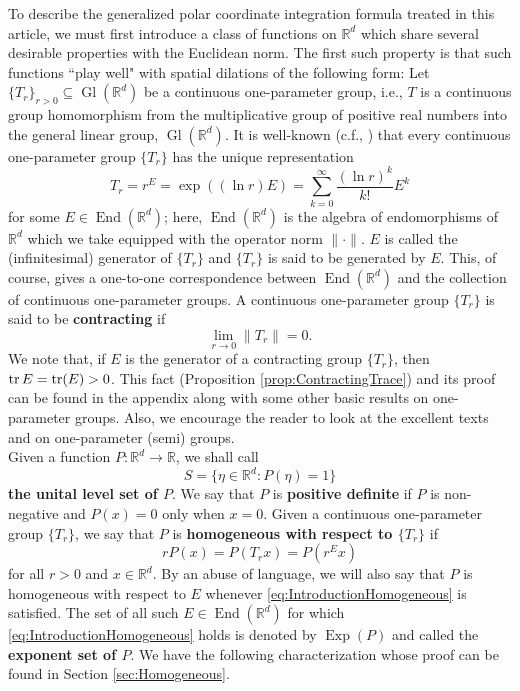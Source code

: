 \documentclass[smallextended]{svjour3}
\theoremstyle{remark}
\newcommand\End{\operatorname{End}} %
\newcommand\Gl{\operatorname{Gl}} %
\newcommand\Exp{\operatorname{Exp}}
\begin{document}
\noindent To describe the generalized polar coordinate integration formula treated in this article, we must first introduce a class of functions on $\mathbb{R}^d$ which share several desirable properties with the Euclidean norm. The first such property is that such functions ``play well" with spatial dilations of the following form: Let $\{T_r\}_{r>0}\subseteq \Gl(\mathbb{R}^d)$ be a continuous one-parameter group, i.e., $T$ is a continuous group homomorphism from the multiplicative group of positive real numbers into the general linear group, $\Gl(\mathbb{R}^d)$. It is well-known (c.f., \cite{randles_convolution_2017,engel_one-parameter_2000,engel_short_2006}) that every continuous one-parameter group $\{T_r\}$ has the unique representation
\begin{equation*}
T_r=r^E=\exp((\ln r) E)=\sum_{k=0}^\infty \frac{(\ln r)^k}{k!}E^k
\end{equation*}
for some $E\in\End(\mathbb{R}^d)$; here,  $\End(\mathbb{R}^d)$ is the algebra of endomorphisms of $\mathbb{R}^d$ which we take equipped with the operator norm $\|\cdot\|$. $E$ is called the (infinitesimal) generator of $\{T_r\}$ and $\{T_r\}$ is said to be generated by $E$. This, of course, gives a one-to-one correspondence between $\End(\mathbb{R}^d)$ and the collection of continuous one-parameter groups.  A continuous one-parameter group $\{T_r\}$ is said to be \textbf{contracting} if
\begin{equation*}
\lim_{r\to 0}\|T_r\|=0. 
\end{equation*}
We note that, if $E$ is the generator of a contracting group $\{T_r\}$, then $\tr E=\tr(E)>0$. This fact (Proposition \ref{prop:ContractingTrace}) and its proof can be found in the appendix along with some other basic results on one-parameter groups. Also, we encourage the reader to look at the excellent texts \cite{engel_one-parameter_2000} and \cite{engel_short_2006} on one-parameter (semi) groups.\\

\noindent Given a function $P:\mathbb{R}^d\to\mathbb{R}$, we shall call
\begin{equation*}
    S=\{\eta\in\mathbb{R}^d:P(\eta)=1\}
\end{equation*}
\textbf{the unital level set of $P$}. We say that $P$ is \textbf{positive definite} if $P$ is non-negative and $P(x)=0$ only when $x=0$. Given a continuous one-parameter group $\{T_r\}$, we say that $P$ is \textbf{homogeneous with respect to $\{T_r\}$} if
\begin{equation}\label{eq:IntroductionHomogeneous}
    rP(x)=P(T_r x)=P(r^Ex)
\end{equation}
for all $r>0$ and $x\in\mathbb{R}^d$. By an abuse of language, we will also say that $P$ is homogeneous with respect to $E$ whenever \eqref{eq:IntroductionHomogeneous} is satisfied. The set of all such $E\in \End(\mathbb{R}^d)$ for which \eqref{eq:IntroductionHomogeneous} holds is denoted by $\Exp(P)$ and called the \textbf{exponent set of $P$}. We have the following characterization whose proof can be found in Section \ref{sec:Homogeneous}.
\end{document}
